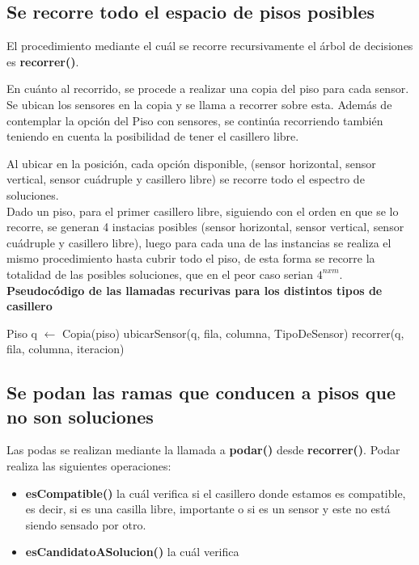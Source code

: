 \documentclass[a4paper, 10pt, twoside]{article}
\newenvironment{pseudo}[1][]{%
    \vspace{0.5em}%
    \begin{algorithmic}%
}
{%
    \end{algorithmic}%
    \vspace{0.5em}%
}
\begin{document}
\subsection{Se recorre todo el espacio de pisos posibles}

El procedimiento mediante el cuál se recorre recursivamente el árbol de decisiones es \textbf{recorrer()}.

En cuánto al recorrido, se procede a realizar una copia del piso para cada sensor. Se ubican los sensores en la copia y se llama a recorrer sobre esta.
Además de contemplar la opción del Piso con sensores, se continúa recorriendo también teniendo en cuenta la posibilidad de tener el casillero libre.

Al ubicar en la posición, cada opción disponible, (sensor horizontal, sensor vertical, sensor cuádruple y casillero libre) se recorre todo el espectro de soluciones. \\

Dado un piso, para el primer casillero libre, siguiendo con el orden en que se lo recorre, se generan 4 instacias posibles (sensor horizontal, sensor vertical, sensor cuádruple y casillero libre), luego para cada una de las instancias se realiza el mismo procedimiento hasta cubrir todo el piso, de esta forma se recorre la totalidad de las posibles soluciones, que en el peor caso serian $4^{nxm}$.\\
\textbf{Pseudocódigo de las llamadas recurivas para los distintos tipos de casillero}

\begin{pseudo}
  \State Piso q $\leftarrow$ Copia(piso)
    \State ubicarSensor(q, fila, columna, TipoDeSensor)
  \State recorrer(q, fila, columna, iteracion)
\end{pseudo}


\subsection{Se podan las ramas que conducen a pisos que no son soluciones}

Las podas se realizan mediante la llamada a \textbf{podar()} desde \textbf{recorrer()}. Podar realiza las siguientes operaciones:

\begin{itemize}
  \item \textbf{esCompatible()} la cuál verifica si el casillero donde estamos es compatible, es decir, si es una casilla libre, importante o si es un sensor y este no está siendo sensado por otro.
    \item \textbf{esCandidatoASolucion()} la cuál verifica 
\end{itemize}
\end{document}
